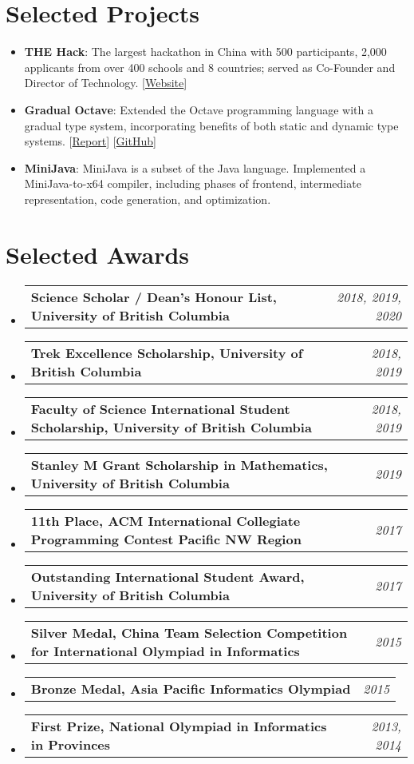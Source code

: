 \documentclass[letterpaper,11pt]{article}
\makeatletter
\newcommand{\resumeItem}[2]{
  \item\small{
    \textbf{#1}{: #2 \vspace{-2pt}}
  }
}
\newcommand{\awardSubItem}[2]{
  \item
    \begin{tabular*}{0.97\textwidth}{l@{\extracolsep{\fill}}r}
      \textbf{\small #1} & \textit{\small #2} \\
    \end{tabular*}\vspace{-8pt}
}
\newcommand{\resumeSubItem}[2]{\resumeItem{#1}{#2}\vspace{-4pt}}
\newcommand{\resumeSubHeadingListStart}{\begin{itemize}[leftmargin=*]}
\newcommand{\resumeSubHeadingListEnd}{\end{itemize}}
\makeatother
\begin{document}
\section{Selected Projects}
  \resumeSubHeadingListStart
    \resumeSubItem{THE Hack}
      {The largest hackathon in China with 500 participants, 2,000 applicants from over 400 schools and 8 countries; served as Co-Founder and Director of Technology. [\href{https://2018.thehack.org.cn/}{Website}]}
    \resumeSubItem{Gradual Octave}
      {Extended the Octave programming language with a gradual type system, incorporating benefits of both static and dynamic type systems. [\href{http://ypan.me/docs/gradual-octave.pdf}{Report}] [\href{https://github.com/yuchong-pan/gradual-octave}{GitHub}]}
    \resumeSubItem{MiniJava}
      {MiniJava is a subset of the Java language. Implemented a MiniJava-to-x64 compiler, including phases of frontend, intermediate representation, code generation, and optimization.}
  \resumeSubHeadingListEnd

\section{Selected Awards}
  \resumeSubHeadingListStart
    \awardSubItem{Science Scholar / Dean's Honour List, University of British Columbia}{2018, 2019, 2020}
    \awardSubItem{Trek Excellence Scholarship, University of British Columbia}{2018, 2019}
    \awardSubItem{Faculty of Science International Student Scholarship, University of British Columbia}{2018, 2019}
    \awardSubItem{Stanley M Grant Scholarship in Mathematics, University of British Columbia}{2019}
    \awardSubItem{11th Place, ACM International Collegiate Programming Contest Pacific NW Region}{2017}
    \awardSubItem{Outstanding International Student Award, University of British Columbia}{2017}
    \awardSubItem{Silver Medal, China Team Selection Competition for International Olympiad in Informatics}{2015}
    \awardSubItem{Bronze Medal, Asia Pacific Informatics Olympiad}{2015}
    \awardSubItem{First Prize, National Olympiad in Informatics in Provinces}{2013, 2014}
  \resumeSubHeadingListEnd
\end{document}
